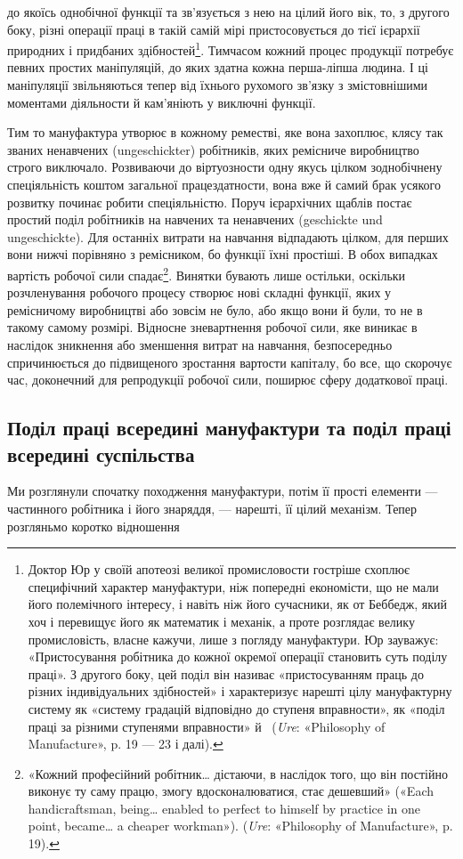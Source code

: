 \parcont{}  %
до якоїсь однобічної функції та зв’язується з нею на цілий його
вік, то, з другого боку, різні операції праці в такій самій мірі
пристосовується до тієї ієрархії природних і придбаних здібностей\footnote{
Доктор Юр у своїй апотеозі великої промисловости гостріше
схоплює специфічний характер мануфактури, ніж попередні економісти,
що не мали його полемічного інтересу, і навіть ніж його сучасники,
як от Беббедж, який хоч і перевищує його як математик і механік, а проте
розглядає велику промисловість, власне кажучи, лише з погляду мануфактури.
Юр зауважує: «Пристосування робітника до кожної окремої
операції становить суть поділу праці». З другого боку, цей поділ він називає
«пристосуванням праць до різних індивідуальних здібностей» і характеризує
нарешті цілу мануфактурну систему як «систему градацій
відповідно до ступеня вправности», як «поділ праці за різними ступенями
вправности» й~ (\emph{Ure}: «Philosophy of Manufacture», p. 19 —
23 і далі).
}. Тимчасом кожний процес продукції потребує певних
простих маніпуляцій, до яких здатна кожна перша-ліпша людина.
І ці маніпуляції звільняються тепер від їхнього рухомого
зв’язку з змістовнішими моментами діяльности й кам’яніють у
виключні функції.

Тим то мануфактура утворює в кожному реместві, яке вона
захоплює, клясу так званих ненавчених (ungeschickter) робітників,
яких ремісниче виробництво строго виключало. Розвиваючи
до віртуозности одну якусь цілком зоднобічнену спеціяльність
коштом загальної працездатности, вона вже й самий брак усякого
розвитку починає робити спеціяльністю. Поруч ієрархічних
щаблів постає простий поділ робітників на навчених та ненавчених
(geschickte und ungeschickte). Для останніх витрати
на навчання відпадають цілком, для перших вони нижчі порівняно
з ремісником, бо функції їхні простіші. В обох випадках вартість
робочої сили спадає\footnote{
«Кожний професійний робітник\dots{} дістаючи, в наслідок того,
що він постійно виконує ту саму працю, змогу вдосконалюватися, стає
дешевший» («Each handicraftsman, being\dots{} enabled to perfect to himself
by practice in one point, became\dots{} a cheaper workman»). (\emph{Ure}:
«Philosophy of Manufacture», p. 19).
}. Винятки бувають лише остільки, оскільки
розчленування робочого процесу створює нові складні функції,
яких у ремісничому виробництві або зовсім не було, або якщо вони
й були, то не в такому самому розмірі. Відносне зневартнення
робочої сили, яке виникає в наслідок зникнення або зменшення
витрат на навчання, безпосередньо спричинюється до підвищеного
зростання вартости капіталу, бо все, що скорочує час, доконечний
для репродукції робочої сили, поширює сферу додаткової
праці.

\subsection{Поділ праці всередині мануфактури та поділ праці
всередині суспільства}

Ми розглянули спочатку походження мануфактури, потім
її прості елементи — частинного робітника і його знаряддя, —
нарешті, її цілий механізм. Тепер розгляньмо коротко відношення
\parbreak{}  %
